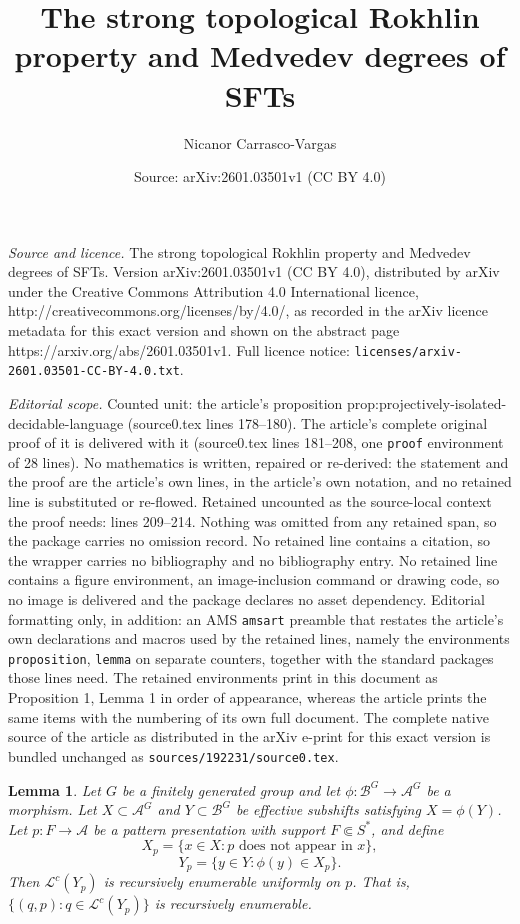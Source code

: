\documentclass[10pt,a4paper]{amsart}
\title{The strong topological Rokhlin property and Medvedev degrees of SFTs}
\author{Nicanor Carrasco-Vargas}
\date{Source: arXiv:2601.03501v1 (CC BY 4.0)}
\newtheorem{lemma}{Lemma}
\newcommand{\A}{\mathcal{A}}
\newcommand{\B}{\mathcal{B}}
\newcommand{\Lep}{\mathscr{L}}
\begin{document}
\maketitle

\noindent\emph{Source and licence.} The strong topological Rokhlin property and Medvedev degrees of SFTs. Version arXiv:2601.03501v1 (CC BY 4.0), distributed by arXiv under the Creative Commons Attribution 4.0 International licence, http://creativecommons.org/licenses/by/4.0/, as recorded in the arXiv licence metadata for this exact version and shown on the abstract page https://arxiv.org/abs/2601.03501v1. Full licence notice: \texttt{licenses/arxiv-2601.03501-CC-BY-4.0.txt}.\par\smallskip

\noindent\textit{Editorial scope.} Counted unit: the article's proposition prop:projectively-isolated-decidable-language (source0.tex lines 178--180). The article's complete original proof of it is delivered with it (source0.tex lines 181--208, one \texttt{proof} environment of 28 lines). No mathematics is written, repaired or re-derived: the statement and the proof are the article's own lines, in the article's own notation, and no retained line is substituted or re-flowed.  Retained uncounted as the source-local context the proof needs: lines 209--214.  Nothing was omitted from any retained span, so the package carries no omission record.  No retained line contains a citation, so the wrapper carries no bibliography and no bibliography entry.  No retained line contains a figure environment, an image-inclusion command or drawing code, so no image is delivered and the package declares no asset dependency.  Editorial formatting only, in addition: an AMS \texttt{amsart} preamble that restates the article's own declarations and macros used by the retained lines, namely the environments \texttt{proposition}, \texttt{lemma} on separate counters, together with the standard packages those lines need.  The retained environments print in this document as Proposition 1, Lemma 1 in order of appearance, whereas the article prints the same items with the numbering of its own full document.  The complete native source of the article as distributed in the arXiv e-print for this exact version is bundled unchanged as \texttt{sources/192231/source0.tex}.
\begin{lemma}\label{lemma}
    Let $G$ be a finitely generated group and let $\phi\colon \B^G\to \A^G$ be a morphism. Let $X\subset\A^G$ and  $Y\subset \B^G$ be effective subshifts satisfying $X=\phi(Y)$. Let $p\colon F\to \A$ be a pattern presentation with support $F\Subset S^\ast$, and define
    \[X_p=\{x\in X : \text{$p$ does not appear in $x$}\},\] 
    \[Y_p=\{y \in Y : \phi(y)\in X_p\}.\]
    Then $\Lep^c(Y_p)$ is recursively enumerable uniformly on $p$. That is, $\{(q,p) : q\in \Lep^c(Y_p)\}$ is recursively enumerable.  
\end{lemma}
\end{document}
